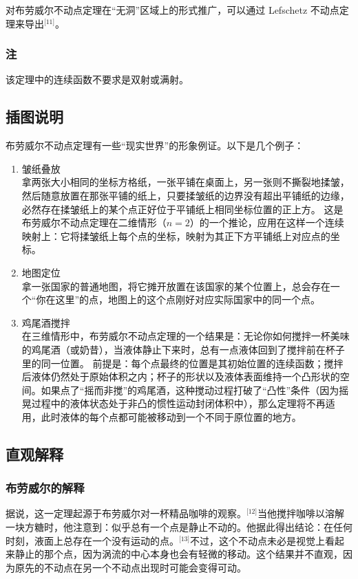 对布劳威尔不动点定理在“无洞”区域上的形式推广，可以通过 Lefschetz 不动点定理来导出\(^\text{[11]}\)。
\subsubsection{注}
该定理中的连续函数不要求是双射或满射。
\subsection{插图说明}
布劳威尔不动点定理有一些“现实世界”的形象例证。以下是几个例子：
\begin{enumerate}
\item 皱纸叠放\\
   拿两张大小相同的坐标方格纸，一张平铺在桌面上，另一张则不撕裂地揉皱，然后随意放置在那张平铺的纸上，只要揉皱纸的边界没有超出平铺纸的边缘，必然存在揉皱纸上的某个点正好位于平铺纸上相同坐标位置的正上方。
   这是布劳威尔不动点定理在二维情形（$n = 2$）的一个推论，应用在这样一个连续映射上：它将揉皱纸上每个点的坐标，映射为其正下方平铺纸上对应点的坐标。
\item 地图定位\\
   拿一张国家的普通地图，将它摊开放置在该国家的某个位置上，总会存在一个“你在这里”的点，地图上的这个点刚好对应实际国家中的同一个点。
\item 鸡尾酒搅拌\\
   在三维情形中，布劳威尔不动点定理的一个结果是：无论你如何搅拌一杯美味的鸡尾酒（或奶昔），当液体静止下来时，总有一点液体回到了搅拌前在杯子里的同一位置。
   前提是：每个点最终的位置是其初始位置的连续函数；搅拌后液体仍然处于原始体积之内；杯子的形状以及液体表面维持一个凸形状的空间。如果点了“摇而非搅”的鸡尾酒，这种搅动过程打破了“凸性”条件（因为摇晃过程中的液体状态处于非凸的惯性运动封闭体积中），那么定理将不再适用，此时液体的每个点都可能被移动到一个不同于原位置的地方。
\end{enumerate}
\subsection{直观解释}
\subsubsection{布劳威尔的解释}
据说，这一定理起源于布劳威尔对一杯精品咖啡的观察。\(^\text{[12]}\)当他搅拌咖啡以溶解一块方糖时，他注意到：似乎总有一个点是静止不动的。他据此得出结论：在任何时刻，液面上总存在一个没有运动的点。\(^\text{[13]}\)不过，这个不动点未必是视觉上看起来静止的那个点，因为涡流的中心本身也会有轻微的移动。这个结果并不直观，因为原先的不动点在另一个不动点出现时可能会变得可动。

